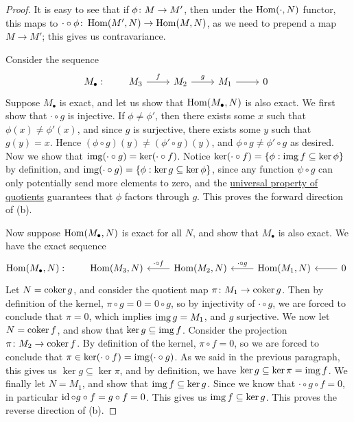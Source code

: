 \begin{proof}
    \medskip

    It is easy to see that if \(\phi\colon M\to M'\),
    then under the \(\operatorname{Hom}(\cdot,N)\) functor,
    this maps to \(\cdot\circ\phi\colon\operatorname{Hom}(M',N)\to\operatorname{Hom}(M,N)\),
    as we need to prepend a map \(M \to M'\);
    this gives us contravariance.

    Consider the sequence
    \begin{equation*}
        M_\bullet: \qquad
        \begin{tikzcd}
            M_3 \arrow{r}{f} & M_2 \arrow{r}{g} & M_1 \arrow{r} & 0
        \end{tikzcd}
    \end{equation*}
    Suppose \(M_\bullet\) is exact, and let us show that \(\operatorname{Hom}(M_\bullet,N)\) is also exact.
    We first show that \(\cdot\circ g\) is injective.
    If \(\phi\neq\phi'\), then there exists some \(x\) such that \(\phi(x) \neq \phi'(x)\),
    and since \(g\) is surjective, there exists some \(y\) such that \(g(y) = x\).
    Hence \((\phi\circ g)(y) \neq (\phi'\circ g)(y)\),
    and \(\phi\circ g \neq \phi'\circ g\) as desired.
    Now we show that \(\operatorname{img}(\cdot\circ g) = \ker(\cdot\circ f)\).
    Notice \(\ker(\cdot\circ f) = \{\phi: \operatorname{img} f \subseteq \ker\phi\}\) by definition,
    and \(\operatorname{img}(\cdot\circ g) = \{\phi: \ker g \subseteq \ker\phi\}\),
    since any function \(\psi\circ g\) can only potentially send more elements to zero,
    and the \hyperref[thm:univ-prop-quotient-mod]{universal property of quotients}
    guarantees that \(\phi\) factors through \(g\).
    This proves the forward direction of (b).

    Now suppose \(\operatorname{Hom}(M_\bullet,N)\) is exact for all \(N\),
    and show that \(M_\bullet\) is also exact.
    We have the exact sequence
    \begin{equation*}
        \Hom(M_\bullet,N): \qquad
        \begin{tikzcd}
            \Hom(M_3,N) & \Hom(M_2,N) \arrow{l}[swap]{\cdot\circ f} &
            \Hom(M_1,N) \arrow{l}[swap]{\cdot\circ g} & 0 \arrow{l}
        \end{tikzcd}
    \end{equation*}
    Let \(N = \operatorname{coker} g\), and consider the quotient map \(\pi\colon M_1\to\operatorname{coker} g\).
    Then by definition of the kernel, \(\pi\circ g = 0 = 0\circ g\),
    so by injectivity of \(\cdot\circ g\),
    we are forced to conclude that \(\pi = 0\),
    which implies \(\operatorname{img} g = M_1\), and \(g\) surjective.
    We now let \(N = \operatorname{coker} f\), and show that \(\ker g \subseteq \operatorname{img} f\).
    Consider the projection \(\pi\colon M_2\to\operatorname{coker} f\).
    By definition of the kernel, \(\pi\circ f = 0\),
    so we are forced to conclude that \(\pi \in \ker(\cdot\circ f) = \operatorname{img}(\cdot\circ g)\).
    As we said in the previous paragraph, this gives us \(\ker g \subseteq \ker\pi\),
    and by definition, we have \(\ker g \subseteq \ker\pi = \operatorname{img} f\).
    We finally let \(N = M_1\), and show that \(\operatorname{img} f \subseteq \ker g\).
    Since we know that \(\cdot\circ g\circ f = 0\),
    in particular \(\operatorname{id}\circ g\circ f = g\circ f = 0\).
    This gives us \(\operatorname{img} f \subseteq \ker g\).
    This proves the reverse direction of (b).
\end{proof}

